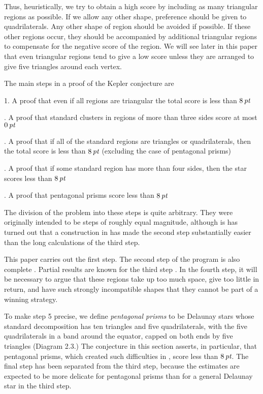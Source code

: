 Thus, heuristically, we try to obtain a high score by including
as many triangular regions as possible.  If we allow any other
shape, preference should be given to  quadrilaterals.  Any other
shape of region should be avoided if possible.  If these other
regions occur, they should be accompanied by additional
triangular regions to compensate for the negative score of the
region.  We will see later in this paper that even triangular
regions tend to give a low score unless they are arranged to give five
triangles around each vertex.

The main steps in a proof of the Kepler conjecture are

{\it

\def\ha{ \hangindent=20pt \hangafter=1\relax }
1. A proof that even if all 
regions are triangular the total score
is less than $8\,\hbox{\it pt}$

\ha
2. A proof that standard clusters in regions of more than
three sides score at most $0\,\hbox{\it pt}$

\ha
3. A proof that if all of the 
standard regions 
are triangles or quadrilaterals,
then the total score is less than $8\,\hbox{\it pt}$ (excluding the
case of pentagonal prisms)

\ha
4.  A proof that if some standard region 
has more than
four sides, then the star scores less than $8\,\hbox{\it pt}$


\ha
5.  A proof that pentagonal prisms score less than $8\,\hbox{\it pt}$

}

The division of the problem into these steps is
quite arbitrary.  
  They were originally
intended to be steps of roughly equal magnitude, although
is has turned out that a construction in
\cite{H4} has made the second step substantially easier
than the long calculations of the third step.

This paper carries out the first step.   The second step of the
program is also complete \cite{H4}.
Partial results are known for the third step \cite{H5}.
In the fourth step,
it will be necessary to argue
that these regions take up too much space, give too little in return,
and have such strongly incompatible shapes that they cannot be
part of a winning strategy.

To make step 5 precise,
we define {\it pentagonal prisms\/} to be Delaunay stars whose
standard decomposition has ten triangles and five quadrilaterals,
with the five quadrilaterals in a band around the equator,
capped on both ends by five triangles
(Diagram 2.3.)
The conjecture in this section
asserts, in particular,
that pentagonal prisms, which created such difficulties
in \cite{H2},  score less than $8\,\hbox{\it pt}$.  
The final step has been separated from the third
step, because the estimates are expected to be more delicate
for pentagonal prisms than for a general
Delaunay star in the third step.

